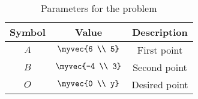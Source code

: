 \begin{table}[H]
\centering
\begin{tabular}{|c|c|c|}
\hline
\textbf{Symbol} & \textbf{Value} & \textbf{Description} \\
\hline
$A$ & $\myvec{6 \\ 5}$ & First point \\
\hline
$B$ & $\myvec{-4 \\ 3}$ & Second point \\
\hline
$O$ & $\myvec{0 \\ y}$ & Desired point \\
\hline
\end{tabular}
\caption{Parameters for the problem}
\label{tab:10/7/1/7Table-1}
\end{table}
